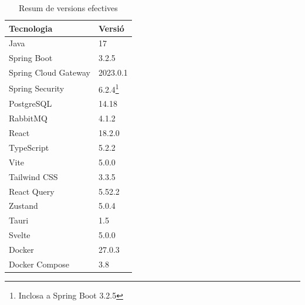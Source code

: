 \begin{table}[H]
\centering
\caption{Resum de versions efectives}
\label{tab:versions}
\begin{tabular}{@{}p{5cm}p{3cm}@{}}
\toprule
\textbf{Tecnologia} & \textbf{Versió} \\
\midrule
Java & 17 \\
Spring Boot & 3.2.5 \\
Spring Cloud Gateway & 2023.0.1 \\
Spring Security & 6.2.4\footnote{Inclosa a Spring Boot 3.2.5} \\
PostgreSQL & 14.18 \\
RabbitMQ & 4.1.2 \\
React & 18.2.0 \\
TypeScript & 5.2.2 \\
Vite & 5.0.0 \\
Tailwind CSS & 3.3.5 \\
React Query & 5.52.2 \\
Zustand & 5.0.4 \\
Tauri & 1.5 \\
Svelte & 5.0.0 \\
Docker & 27.0.3 \\
Docker Compose & 3.8 \\
\bottomrule
\end{tabular}
\end{table}


